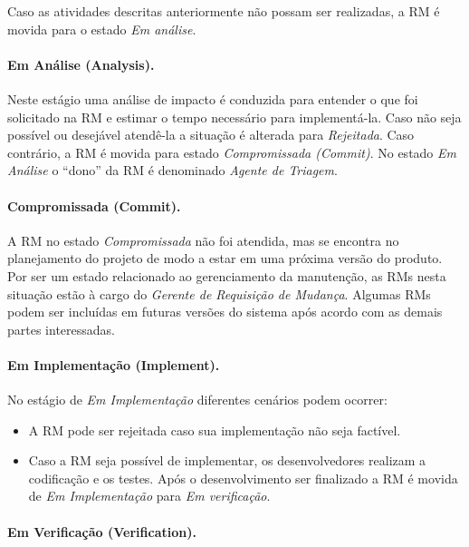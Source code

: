 Caso as atividades descritas anteriormente não possam ser re\-a\-li\-za\-das, a
RM é movida para o estado \textit{Em análise}.

\paragraph{Em Análise (Analysis).}
\label{par:em_analise}
Neste estágio uma análise de impacto é conduzida para entender o que foi
solicitado na RM e estimar o tempo necessário para implementá-la. Caso não seja
possível ou desejável atendê-la a situação é alterada para \textit{Rejeitada}.
Caso contrário, a RM é movida para estado \textit{Compromissada (Commit)}. No
estado \textit{Em Análise} o ``dono'' da RM é denominado \textit{Agente de
    Triagem}.

\paragraph{Compromissada (Commit).}
\label{par:commit}

A RM no estado \textit{Compromissada} não foi atendida, mas se encontra no
planejamento do projeto de modo a estar em uma próxima versão do produto. Por
ser um estado relacionado ao gerenciamento da manutenção, as RMs nesta situação
estão à cargo do \textit{Gerente de Requisição de Mudança}. Algumas RMs podem
ser incluídas em futuras versões do sistema após acordo com as demais partes
interessadas.

\paragraph{Em Implementação (Implement).}
\label{par:em_implementacao}

No estágio de \textit{Em Implementação} diferentes cenários podem ocorrer:

\begin{itemize}
	\item A RM pode ser rejeitada caso sua implementação não seja factível.
    \item Caso a RM seja possível de implementar, os desenvolvedores realizam a
        codificação e os testes. Após o desenvolvimento ser finalizado a RM é
        movida de \textit{Em Implementação} para \textit{Em verificação}.
\end{itemize}

\paragraph{Em Verificação (Verification).}
\label{par:em_verificacao}

